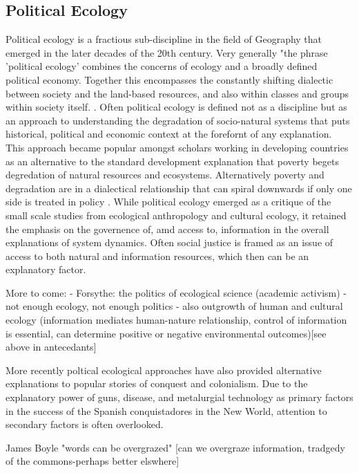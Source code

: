 \subsection{Political Ecology}

Political ecology is a fractious sub-discipline in the field of Geography that emerged in the later decades of the 20th century. Very generally "the phrase 'political ecology' combines the concerns of ecology and a broadly defined political economy. Together this encompasses the constantly shifting dialectic between society and the land-based resources, and also within classes and groups within society itself. \citep[][p. 17]{blaikie_1987}. Often political ecology is defined not as a discipline but as an approach to understanding the degradation of socio-natural systems that puts historical, political and economic context at the forefornt of any explanation. This approach became popular amongst scholars working in developing countries as an alternative to the standard development explanation that poverty begets degredation of natural resources and ecosystems. Alternatively poverty and degradation are in a dialectical relationship that can spiral downwards if only one side is treated in policy \citep{blaikie_1987, peet_1996}. While political ecology emerged as a critique of the small scale studies from ecological anthropology and cultural ecology, it retained the emphasis on the governence of, amd access to, information in the overall explanations of system dynamics. Often social justice is framed as an issue of access to both natural and information resources, which then can be an explanatory factor.

More to come:
- Forsythe: the politics of ecological science (academic activism) \citep{forsyth_2003,huxley_1974}
- not enough ecology, not enough politics \citep{walker_2005,walker_2007}
- also outgrowth of human and cultural ecology (information mediates human-nature relationship, control of information is essential, can determine positive or negative environmental outcomes)[see above in antecedants]

More recently poltical ecological approaches have also provided alternative explanations to popular stories of conquest and colonialism. Due to the explanatory power of guns, disease, and metalurgial technology as primary factors in the success of the Spanish conquistadores in the New World, attention to secondary factors is often overlooked. 

James Boyle "words can be overgrazed" [can we overgraze information, tradgedy of the commons-perhaps better elswhere]
